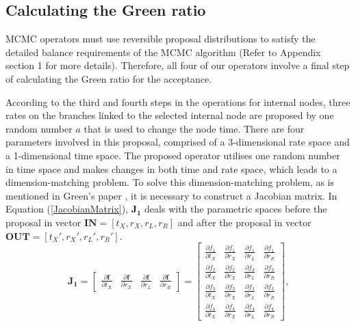 \documentclass{bmcart}
\begin{document}
\subsection*{Calculating the Green ratio}
MCMC operators must use reversible proposal distributions to satisfy the detailed balance requirements of the MCMC algorithm (Refer to  Appendix section 1 for more details). Therefore, all four of our operators involve a final step of calculating the Green ratio for the acceptance.

According to the third and fourth steps in the operations for internal nodes, three rates on the branches linked to the selected internal node are proposed by one random number $a$ that is used to change the node time. There are four parameters involved in this proposal, comprised of a 3-dimensional rate space and a 1-dimensional time space. The proposed operator utilises one random number in time space and makes changes in both time and rate space, which leads to a dimension-matching problem. To solve this dimension-matching problem, as is mentioned in Green's paper \cite{green1995reversible}, it is necessary to construct a Jacobian matrix.  In Equation (\ref{JacobianMatrix}), ${\mathbf{J_1}}$ deals with the parametric spaces before the proposal in vector ${\mathbf{IN}} = [{t_X},{r_X},{r_L},{r_R}]$ and after the proposal in vector ${\mathbf{OUT}} = [{t_X}',{r_X}',{r_L}',{r_R}']$.
\begin{equation}\label{JacobianMatrix}
{\mathbf{J_1}} = \left[ {\begin{array}{*{20}{c}}
  {\frac{{\partial {\mathbf{f}}}}{{\partial {t_X}}}}&{\frac{{\partial {\mathbf{f}}}}{{\partial {r_X}}}}&{\frac{{\partial {\mathbf{f}}}}{{\partial {r_L}}}}&{\frac{{\partial {\mathbf{f}}}}{{\partial {r_R}}}}
\end{array}} \right] = \left[ {\begin{array}{*{20}{c}}
  {\frac{{\partial {f_1}}}{{\partial {t_X}}}}&{\frac{{\partial {f_1}}}{{\partial {r_X}}}}&{\frac{{\partial {f_1}}}{{\partial {r_L}}}}&{\frac{{\partial {f_1}}}{{\partial {r_R}}}} \\
  {\frac{{\partial {f_2}}}{{\partial {t_X}}}}&{\frac{{\partial {f_2}}}{{\partial {r_X}}}}&{\frac{{\partial {f_2}}}{{\partial {r_L}}}}&{\frac{{\partial {f_2}}}{{\partial {r_R}}}} \\
  {\frac{{\partial {f_3}}}{{\partial {t_X}}}}&{\frac{{\partial {f_3}}}{{\partial {r_X}}}}&{\frac{{\partial {f_3}}}{{\partial {r_L}}}}&{\frac{{\partial {f_3}}}{{\partial {r_R}}}} \\
  {\frac{{\partial {f_4}}}{{\partial {t_X}}}}&{\frac{{\partial {f_4}}}{{\partial {r_X}}}}&{\frac{{\partial {f_4}}}{{\partial {r_L}}}}&{\frac{{\partial {f_4}}}{{\partial {r_R}}}}
\end{array}} \right]\text{,}
\end{equation}
\end{document}
